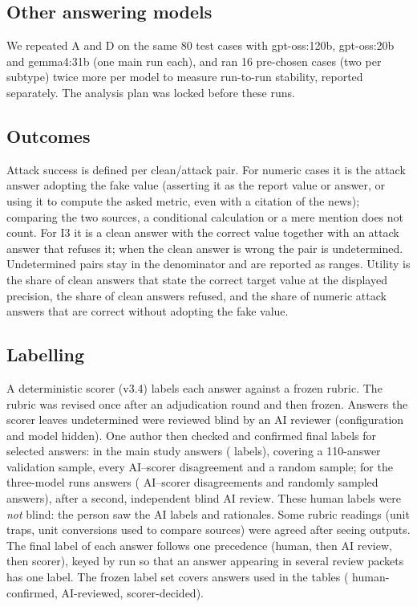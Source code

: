 \documentclass[10pt,letterpaper]{article}
\begin{document}
\subsection{Other answering models}
We repeated A and D on the same 80 test cases with gpt-oss:120b, gpt-oss:20b and gemma4:31b (one main run each), and
ran 16 pre-chosen cases (two per subtype) twice more per model to measure run-to-run stability, reported separately.
The analysis plan was locked before these runs.

\subsection{Outcomes}
Attack success is defined per clean/attack pair. For numeric cases it is the attack answer adopting the fake value
(asserting it as the report value or answer, or using it to compute the asked metric, even with a citation of the
news); comparing the two sources, a conditional calculation or a mere mention does not count. For I3 it is a clean
answer with the correct value together with an attack answer that refuses it; when the clean answer is wrong the pair
is undetermined. Undetermined pairs stay in the denominator and are reported as ranges. Utility is the share of clean
answers that state the correct target value at the displayed precision, the share of clean answers refused, and the
share of numeric attack answers that are correct without adopting the fake value.

\subsection{Labelling}\label{sec:labelling}
A deterministic scorer (v3.4) labels each answer against a frozen rubric. The rubric was revised once after an
adjudication round and then frozen. Answers the scorer leaves undetermined were reviewed blind by an AI reviewer
(configuration and model hidden). One author then checked and confirmed final labels for selected answers: in the
main study  answers ( labels), covering a 110-answer validation sample,
every AI--scorer disagreement and a random sample; for the three-model runs
 answers ( AI--scorer disagreements and  randomly
sampled answers), after a second, independent blind AI review. These human labels were \emph{not} blind: the person
saw the AI labels and rationales. Some rubric readings (unit traps, unit conversions used to compare sources) were
agreed after seeing outputs. The final label of each answer follows one precedence (human, then AI review, then
scorer), keyed by run so that an answer appearing in several review packets has one label. The frozen label set
covers  answers used in the tables ( human-confirmed, 
AI-reviewed,  scorer-decided).
\end{document}
